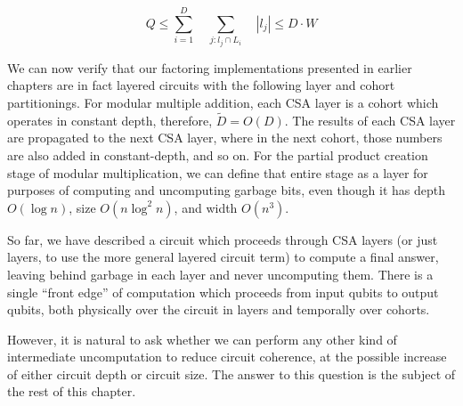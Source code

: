 \begin{equation}
Q \le \sum_{i=1}^{D} \quad \sum_{j: l_j \cap L_i} \quad |l_j| \le D\cdot W
\end{equation}



We can now verify that our factoring implementations presented in earlier
chapters are in fact layered circuits with the following layer and cohort
partitionings. For modular multiple addition,
each CSA layer is a cohort
which operates in constant depth, therefore, $\tilde{D} = O(D)$.
The results of
each CSA layer are propagated to the next CSA layer, where in the next cohort,
those numbers are also added in constant-depth, and so on.
For the partial product creation stage of modular multiplication, we can
define that entire stage as a layer for purposes of computing and uncomputing
garbage bits, even though it has depth $O(\log n)$, size $O(n\log^2 n)$, and
width $O(n^3)$.

So far, we have described a circuit which proceeds through CSA layers
(or just layers, to use the more general layered circuit term) to compute
a final answer, leaving behind garbage in each layer and never uncomputing
them.
There is a single ``front edge'' of computation which
proceeds from input qubits to output qubits, both physically over the
circuit in layers and temporally over cohorts.

However,
it is natural to ask whether we
can perform any other kind of intermediate uncomputation to reduce
circuit coherence, at the possible increase of either circuit depth
or circuit size. The answer to this question is the subject of the
rest of this chapter.



